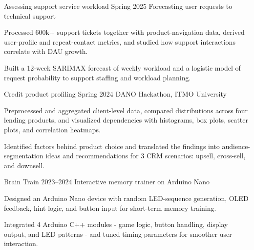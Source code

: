 \documentclass[10pt,a4paper]{article}
\begin{document}
{\begin{minipage}[t][\pagecontentheight]{\mainwidth}
\begin{minipage}[t][\maininnerheight]{\maininnerwidth}
    \MainEntry
      {Assessing support service workload}
      {Spring 2025}
      {Forecasting user requests to technical support}
      {}
      {\begin{mainbullets}
        \item Processed 600k+ support tickets together with product-navigation data, derived user-profile and repeat-contact metrics, and studied how support interactions correlate with DAU growth.
        \item Built a 12-week SARIMAX forecast of weekly workload and a logistic model of request probability to support staffing and workload planning.
      \end{mainbullets}}

    \MainEntry
      {Credit product profiling}
      {Spring 2024}
      {DANO Hackathon, ITMO University}
      {}
      {\begin{mainbullets}
        \item Preprocessed and aggregated client-level data, compared distributions across four lending products, and visualized dependencies with histograms, box plots, scatter plots, and correlation heatmaps.
        \item Identified factors behind product choice and translated the findings into audience-segmentation ideas and recommendations for 3 CRM scenarios: upsell, cross-sell, and downsell.
      \end{mainbullets}}

    \MainEntry
      {Brain Train}
      {2023--2024}
      {Interactive memory trainer on Arduino Nano}
      {}
      {\begin{mainbullets}
        \item Designed an Arduino Nano device with random LED-sequence generation, OLED feedback, hint logic, and button input for short-term memory training.
        \item Integrated 4 Arduino C++ modules - game logic, button handling, display output, and LED patterns - and tuned timing parameters for smoother user interaction.
      \end{mainbullets}}

    \vspace{0.24cm}
    \RightFooter{}
  \end{minipage}
\end{minipage}}
\end{document}
